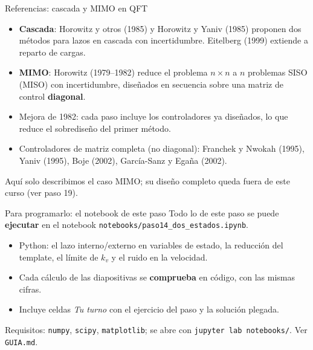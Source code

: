 \documentclass[aspectratio=169,11pt]{beamer}
\begin{document}
\begin{frame}{Referencias: cascada y MIMO en QFT}
  \small
  \begin{itemize}
    \item \textbf{Cascada}: Horowitz y otros (1985) y Horowitz y Yaniv (1985) proponen dos métodos para lazos en cascada con incertidumbre. Eitelberg (1999) extiende a reparto de cargas.
    \item \textbf{MIMO}: Horowitz (1979--1982) reduce el problema $n\times n$ a $n$ problemas SISO (MISO) con incertidumbre, diseñados en secuencia sobre una matriz de control \textbf{diagonal}.
    \item Mejora de 1982: cada paso incluye los controladores ya diseñados, lo que reduce el sobrediseño del primer método.
    \item Controladores de matriz completa (no diagonal): Franchek y Nwokah (1995), Yaniv (1995), Boje (2002), García-Sanz y Egaña (2002).
  \end{itemize}
  \footnotesize Aquí solo describimos el caso MIMO; su diseño completo queda fuera de este curso (ver paso 19).
\end{frame}

\begin{frame}{Para programarlo: el notebook de este paso}
  \small
  Todo lo de este paso se puede \textbf{ejecutar} en el notebook \texttt{notebooks/paso14\_dos\_estados.ipynb}.
  \begin{itemize}
    \item Python: el lazo interno/externo en variables de estado, la reducción del template, el límite de $k_v$ y el ruido en la velocidad.
    \item Cada cálculo de las diapositivas se \textbf{comprueba} en código, con las mismas cifras.
    \item Incluye celdas \emph{Tu turno} con el ejercicio del paso y la solución plegada.
  \end{itemize}
  \footnotesize Requisitos: \texttt{numpy}, \texttt{scipy}, \texttt{matplotlib}; se abre con \texttt{jupyter lab notebooks/}. Ver \texttt{GUIA.md}.
\end{frame}
\end{document}
